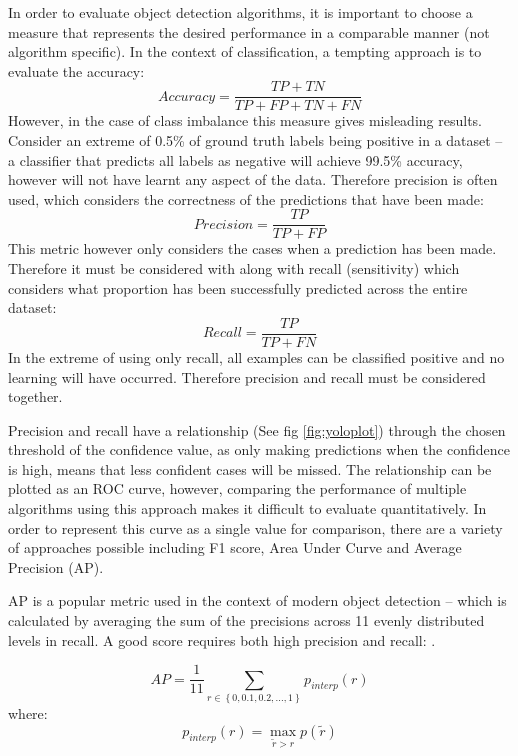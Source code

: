 \documentclass[a4paper,twoside,12pt]{report}
\begin{document}
In order to evaluate object detection algorithms, it is important to choose a measure that represents the desired performance in a comparable manner (not algorithm specific). In the context of classification, a tempting approach is to evaluate the accuracy:
\begin{equation}
Accuracy = \frac{TP + TN}{TP + FP + TN + FN}
\end{equation}
However, in the case of class imbalance this measure gives misleading results. Consider an extreme of 0.5\% of ground truth labels being positive in a dataset -- a classifier that predicts all labels as negative will achieve 99.5\% accuracy, however will not have learnt any aspect of the data. Therefore precision is often used, which considers the correctness of the predictions that have been made:
\begin{equation}
Precision = \frac{TP}{TP + FP}
\end{equation}
This metric however only considers the cases when a prediction has been made. Therefore it must be considered with along with recall (sensitivity) which considers what proportion has been successfully predicted across the entire dataset:
\begin{equation}
Recall = \frac{TP}{TP + FN}
\end{equation}
In the extreme of using only recall, all examples can be classified positive and no learning will have occurred. Therefore precision and recall must be considered together.

Precision and recall have a relationship (See fig \ref{fig:yoloplot}) through the chosen threshold of the confidence value, as only making predictions when the confidence is high, means that less confident cases will be missed. The relationship can be plotted as an ROC curve, however, comparing the performance of multiple algorithms using this approach makes it difficult to evaluate quantitatively. In order to represent this curve as a single value for comparison, there are a variety of approaches possible including F1 score, Area Under Curve and Average Precision (AP).

AP is a popular metric used in the context of modern object detection -- which is calculated by averaging the sum of the precisions across 11 evenly distributed levels in recall. A good score requires both high precision and recall: \citep{vocdataset}.

\begin{equation}
AP = \frac{1}{11}\sum_{r\in\left\{0,0.1,0.2,...,1\right\}}^{} p_{interp}(r)
\end{equation}
where:
\begin{equation}
p_{interp}(r) =\max_{\widetilde{r} > r} p(\widetilde{r})
\end{equation}
\end{document}
